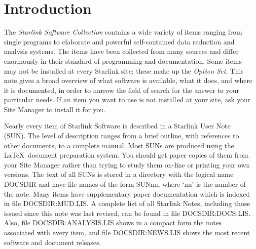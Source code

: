 \newpage

\setlength{\parskip}{0mm}
\tableofcontents
\setlength{\parskip}{\medskipamount}
\markright{\stardocname}

\newpage

\section {Introduction}

The {\em Starlink Software Collection} contains a wide variety of items ranging
from single programs to elaborate and powerful self-contained data reduction
and analysis systems.
The items have been collected from many sources and differ enormously
in their standard of programming and documentation.
Some items may not be installed at every Starlink site; these make up the
{\em Option Set}.
This note gives a broad overview of what software is available, what it does,
and where it is documented, in order to narrow the field of search for the
answer to your particular needs.
If an item you want to use is not installed at your site, ask your Site
Manager to install it for you.

Nearly every item of Starlink Software is described in a Starlink User Note
(SUN).
The level of description ranges from a brief outline, with references to other
documents, to a complete manual.
Most SUNs are produced using the \LaTeX\ document preparation system.
You should get paper copies of them from your Site Manager rather
than trying to study them on-line or printing your own versions.
The text of all SUNs is stored in a directory with the logical name DOCSDIR
and have file names of the form SUNnn, where `nn' is the number of the note.
Many items have supplementary paper documentation which is indexed in file
DOCSDIR:MUD.LIS.
A complete list of all Starlink Notes, including those issued since this note
was last revised, can be found in file DOCSDIR:DOCS.LIS.
Also, file DOCSDIR:ANALYSIS.LIS shows in a compact form the notes associated
with every item, and file DOCSDIR:NEWS.LIS shows the most recent software and
document releases.

